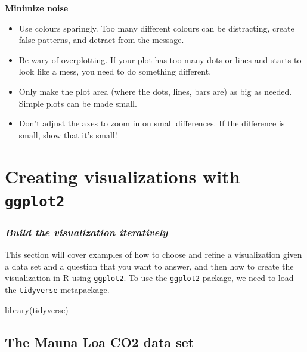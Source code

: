 \documentclass[
]{krantz}
\makeatletter
\newenvironment{Shaded}{\begin{snugshade}}{\end{snugshade}}
\newcommand{\FunctionTok}[1]{\textcolor[rgb]{0,0,0}{#1}}
\newcommand{\NormalTok}[1]{#1}
\providecommand{\tightlist}{%
  \setlength{\itemsep}{0pt}\setlength{\parskip}{0pt}}
\newenvironment{kframe}{%
\medskip{}
\setlength{\fboxsep}{.8em}
 \def\at@end@of@kframe{}%
 \ifinner\ifhmode%
  \def\at@end@of@kframe{\end{minipage}}%
  \begin{minipage}{\columnwidth}%
 \fi\fi%
 \def\FrameCommand##1{\hskip\@totalleftmargin \hskip-\fboxsep
 \colorbox{shadecolor}{##1}\hskip-\fboxsep
     \hskip-\linewidth \hskip-\@totalleftmargin \hskip\columnwidth}%
 \MakeFramed {\advance\hsize-\width
   \@totalleftmargin\z@ \linewidth\hsize
   \@setminipage}}%
 {\par\unskip\endMakeFramed%
 \at@end@of@kframe}
\renewenvironment{Shaded}{\begin{kframe}}{\end{kframe}}
\makeatother
\begin{document}
\textbf{Minimize noise}

\begin{itemize}
\tightlist
\item
  Use colours sparingly. Too many different colours can be distracting, create false patterns, and detract from the message.
\item
  Be wary of overplotting. If your plot has too many dots or lines and starts to look like a mess, you need to do something different.
\item
  Only make the plot area (where the dots, lines, bars are) as big as needed. Simple plots can be made small.
\item
  Don't adjust the axes to zoom in on small differences. If the difference is small, show that it's small!
\end{itemize}

\hypertarget{creating-visualizations-with-ggplot2}{%
\section{\texorpdfstring{Creating visualizations with \texttt{ggplot2}}{Creating visualizations with ggplot2}}\label{creating-visualizations-with-ggplot2}}

\hypertarget{build-the-visualization-iteratively}{%
\subsubsection{\texorpdfstring{\emph{Build the visualization iteratively}}{Build the visualization iteratively}}\label{build-the-visualization-iteratively}}

This section will cover examples of how to choose and refine a visualization given a data set and a question that you want to answer,
and then how to create the visualization in R using \texttt{ggplot2}. To use the \texttt{ggplot2} package, we need to load the \texttt{tidyverse} metapackage.

\begin{Shaded}
\begin{Highlighting}[]
\FunctionTok{library}\NormalTok{(tidyverse)}
\end{Highlighting}
\end{Shaded}

\hypertarget{the-mauna-loa-co2-data-set}{%
\subsection{The Mauna Loa CO2 data set}\label{the-mauna-loa-co2-data-set}}
\end{document}
